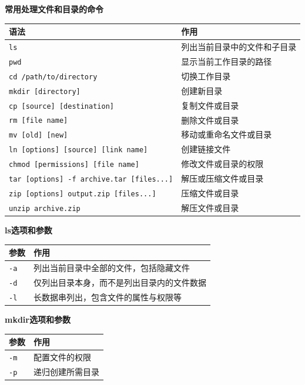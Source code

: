 \begin{table}[H]\centering
\textbf{常用处理文件和目录的命令}

	\begin{tabular}{p{}p{}}
		\toprule[1.5pt]
		语法 & 作用\\
		\midrule[1pt]
		\texttt{ls}		&列出当前目录中的文件和子目录\\
		\texttt{pwd}		&显示当前工作目录的路径\\
		\texttt{cd  /path/to/directory}		&切换工作目录\\
		\texttt{mkdir  [directory]}		&创建新目录\\
		\texttt{cp  [source]  [destination]}		&复制文件或目录\\
		\texttt{rm  [file name]}		&删除文件或目录\\
		\texttt{mv  [old]  [new]}		&移动或重命名文件或目录\\
		\texttt{ln  [options]  [source]  [link name]}		&创建链接文件\\
		\texttt{chmod  [permissions]  [file name]}		&修改文件或目录的权限\\
		\texttt{tar  [options]  -f  archive.tar  [files...]}	&解压或压缩文件或目录\\
		\texttt{zip  [options]  output.zip  [files...]}		&压缩文件或目录\\
		\texttt{unzip  archive.zip}		&解压文件或目录\\
		\bottomrule[1.5pt]
	\end{tabular}
\end{table}



\begin{table}[H]\centering
\textbf{ls\enspace 选项和参数}

	\begin{tabular}{p{}p{}}
		\toprule[1.5pt]
		参数 & 作用\\
		\midrule[1pt]
		\texttt{-a}		&列出当前目录中全部的文件，包括隐藏文件\\
		\texttt{-d}		&仅列出目录本身，而不是列出目录内的文件数据\\
		\texttt{-l}		&长数据串列出，包含文件的属性与权限等\\
		\bottomrule[1.5pt]
	\end{tabular}
\end{table}



\begin{table}[H]\centering
\textbf{mkdir\enspace 选项和参数}

	\begin{tabular}{p{}p{}}
		\toprule[1.5pt]
		参数 & 作用\\
		\midrule[1pt]
		\texttt{-m}		&配置文件的权限\\
		\texttt{-p}		&递归创建所需目录\\
		\bottomrule[1.5pt]
	\end{tabular}
\end{table}



